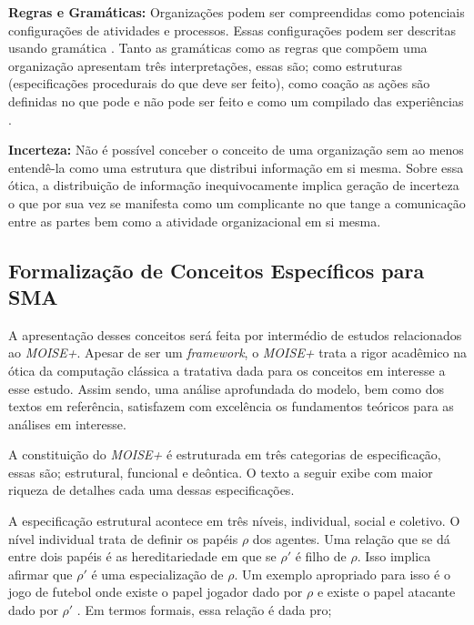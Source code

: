 \textbf{Regras e Gramáticas:} Organizações podem ser compreendidas como potenciais configurações de atividades e processos. Essas configurações podem ser descritas usando gramática \cite{grammarselforganizationmodel} \cite{grammarselforganizationmodel2}. Tanto as gramáticas como as regras que compõem uma organização apresentam três interpretações, essas são; como estruturas (especificações procedurais do que deve ser feito), como coação as ações são definidas no que pode e não pode ser feito e como um compilado das experiências \cite{organiationofmultiagentsystem}.

\textbf{Incerteza:} Não é possível conceber o conceito de uma organização sem ao menos entendê-la como uma estrutura que distribui informação em si mesma. Sobre essa ótica, a distribuição de informação inequivocamente implica geração de incerteza o que por sua vez se manifesta como um complicante no que tange a comunicação entre as partes bem como a atividade organizacional em si mesma.

\subsection{Formalização de Conceitos Específicos para SMA}
\label{moiseformalizesma}
A apresentação desses conceitos será feita por intermédio de estudos relacionados ao \textit{MOISE+}. Apesar de ser um \textit{framework}, o \textit{MOISE+} trata a rigor acadêmico na ótica da computação clássica a tratativa dada para os conceitos em interesse a esse estudo. Assim sendo, uma análise aprofundada do modelo, bem como dos textos em referência, satisfazem com excelência os fundamentos teóricos para as análises em interesse. 

A constituição do \textit{MOISE+} é estruturada em três categorias de especificação, essas são; estrutural, funcional e deôntica. O texto a seguir exibe com maior riqueza de detalhes cada uma dessas especificações.  

A especificação estrutural acontece em três níveis, individual, social e coletivo. O nível individual trata de definir os papéis $\rho$ dos agentes. Uma relação que se dá entre dois papéis é as hereditariedade em que se $\rho'$ é filho de $\rho$. Isso implica afirmar que $\rho'$ é uma especialização de $\rho$. Um exemplo apropriado para isso é o jogo de futebol onde existe o papel jogador dado por $\rho$ e existe o papel atacante dado por $\rho'$ \cite{moiseframework} \cite{roleone} \cite{roletwo} \cite{dynamicagenttemporalstruct}. Em termos formais, essa relação é dada pro; 

